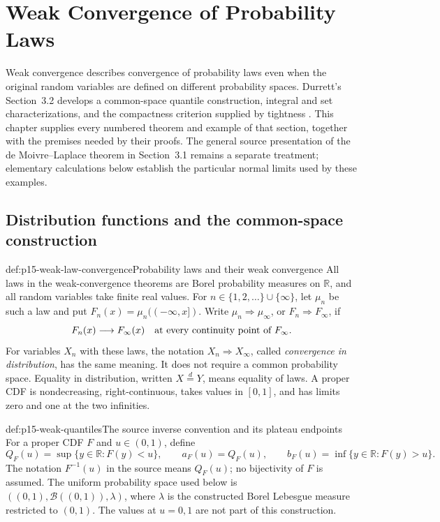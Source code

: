 \chapter{Weak Convergence of Probability Laws}
\label{sec:p15-weak-convergence-of-laws}

Weak convergence describes convergence of probability laws even when
the original random variables are defined on different probability
spaces. Durrett's Section~3.2 develops a common-space quantile
construction, integral and set characterizations, and the compactness
criterion supplied by tightness
\cite[pp.~116--125]{DurrettPTEAuthor2019}.
This chapter supplies every numbered theorem and example of that
section, together with the premises needed by their proofs.
The general source presentation of the de Moivre--Laplace theorem
in Section~3.1 remains a separate treatment; elementary calculations
below establish the particular normal limits used by these examples.

\section{Distribution functions and the common-space construction}
\label{sec:p15-weak-cdf-and-coupling}

\begin{hbdefinition}{def:p15-weak-law-convergence}{Probability laws and their weak convergence}
All laws in the weak-convergence theorems are Borel probability
measures on \(\mathbb R\), and all random variables take finite
real values. For \(n\in\{1,2,\ldots\}\cup\{\infty\}\), let \(\mu_n\)
be such a law and put \(F_n(x)=\mu_n((-\infty,x])\).
Write \(\mu_n\Rightarrow\mu_\infty\), or \(F_n\Rightarrow F_\infty\),
if
\[
 F_n(x)\longrightarrow F_\infty(x)
       \quad\hbox{at every continuity point of }F_\infty.
\]
For variables \(X_n\) with these laws, the notation
\(X_n\Rightarrow X_\infty\), called \emph{convergence in
distribution}, has the same meaning. It does not require a common
probability space. Equality in distribution, written
\(X\stackrel d=Y\), means equality of laws.
A proper CDF is nondecreasing, right-continuous, takes values in
\([0,1]\), and has limits zero and one at the two infinities.
\end{hbdefinition}

\begin{hbdefinition}{def:p15-weak-quantiles}{The source inverse convention and its plateau endpoints}
For a proper CDF \(F\) and \(u\in(0,1)\), define
\[
 Q_F(u)=\sup\{y\in\mathbb R:F(y)<u\},\qquad
 a_F(u)=Q_F(u),\qquad
 b_F(u)=\inf\{y\in\mathbb R:F(y)>u\}.
\]
The notation \(F^{-1}(u)\) in the source means \(Q_F(u)\);
no bijectivity of \(F\) is assumed. The uniform probability
space used below is
\(((0,1),\mathcal B((0,1)),\lambda)\), where \(\lambda\)
is the constructed Borel Lebesgue measure restricted to \((0,1)\).
The values at \(u=0,1\) are not part of this construction.
\end{hbdefinition}

